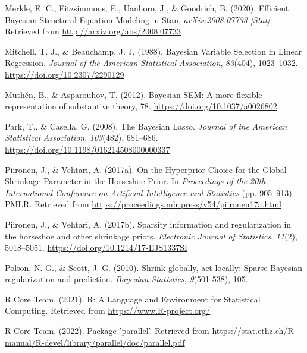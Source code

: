 \documentclass[
  man, donotrepeattitle,floatsintext]{apa6}
\newlength{\cslhangindent}
\newlength{\cslentryspacingunit} %
\newenvironment{CSLReferences}[2] %
 {%
  \setlength{\parindent}{0pt}
  \ifodd #1
  \let\oldpar\par
  \def\par{\hangindent=\cslhangindent\oldpar}
  \fi
  \setlength{\parskip}{#2\cslentryspacingunit}
 }%
 {}
\begin{document}
\begin{CSLReferences}{1}{0}
\leavevmode{}%
Merkle, E. C., Fitzsimmons, E., Uanhoro, J., \& Goodrich, B. (2020). Efficient {Bayesian} {Structural} {Equation} {Modeling} in {Stan}. \emph{arXiv:2008.07733 {[}Stat{]}}. Retrieved from \url{http://arxiv.org/abs/2008.07733}

\leavevmode{}%
Mitchell, T. J., \& Beauchamp, J. J. (1988). Bayesian {Variable} {Selection} in {Linear} {Regression}. \emph{Journal of the American Statistical Association}, \emph{83}(404), 1023--1032. \url{https://doi.org/10.2307/2290129}

\leavevmode{}%
Muthén, B., \& Asparouhov, T. (2012). Bayesian {SEM}: {A} more ﬂexible representation of substantive theory, 78. \url{https://doi.org/10.1037/a0026802}

\leavevmode{}%
Park, T., \& Casella, G. (2008). The {Bayesian} {Lasso}. \emph{Journal of the American Statistical Association}, \emph{103}(482), 681--686. \url{https://doi.org/10.1198/016214508000000337}

\leavevmode{}%
Piironen, J., \& Vehtari, A. (2017a). On the {Hyperprior} {Choice} for the {Global} {Shrinkage} {Parameter} in the {Horseshoe} {Prior}. In \emph{Proceedings of the 20th {International} {Conference} on {Artificial} {Intelligence} and {Statistics}} (pp. 905--913). PMLR. Retrieved from \url{https://proceedings.mlr.press/v54/piironen17a.html}

\leavevmode{}%
Piironen, J., \& Vehtari, A. (2017b). Sparsity information and regularization in the horseshoe and other shrinkage priors. \emph{Electronic Journal of Statistics}, \emph{11}(2), 5018--5051. \url{https://doi.org/10.1214/17-EJS1337SI}

\leavevmode{}%
Polson, N. G., \& Scott, J. G. (2010). Shrink globally, act locally: {Sparse} {Bayesian} regularization and prediction. \emph{Bayesian Statistics}, \emph{9}(501-538), 105.

\leavevmode{}%
R Core Team. (2021). R: {A} {Language} and {Environment} for {Statistical} {Computing}. Retrieved from \url{https://www.R-project.org/}

\leavevmode{}%
R Core Team. (2022). Package 'parallel'. Retrieved from \url{https://stat.ethz.ch/R-manual/R-devel/library/parallel/doc/parallel.pdf}


\end{CSLReferences}
\end{document}
